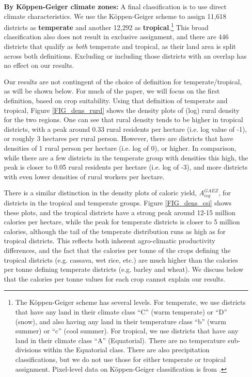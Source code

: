 \documentclass[11pt]{article}
\begin{document}
\vspace{.5cm}\noindent\textbf{By K{\"o}ppen-Geiger climate zones:} A final classification is to use direct climate characteristics. We use the K{\"o}ppen-Geiger scheme to assign 11,618 districts as \textbf{temperate} and another 12,292 as \textbf{tropical}.\footnote{The K{\"o}ppen-Geiger scheme has several levels. For temperate, we use districts that have any land in their climate class ``C'' (warm temperate) or ``D'' (snow), and also having any land in their temperature class ``b'' (warm summer) or ``c'' (cool summer). For tropical, we use districts that have any land in their climate class ``A'' (Equatorial). There are no temperature sub-divisions within the Equatorial class. There are also precipitation classifications, but we do not use those for either temperate or tropical assignment. Pixel-level data on K{\"o}ppen-Geiger classification is from \cite{kottek2006}.} This broad classification also does not result in exclusive assignment, and there are 446 districts that qualify as \textit{both} temperate and tropical, as their land area is split across both definitions. Excluding or including those districts with an overlap has no effect on our results.

\vspace{.5cm} 
Our results are not contingent of the choice of definition for temperate/tropical, as will be shown below. For much of the paper, we will focus on the first definition, based on crop suitability. Using that definition of temperate and tropical, Figure \ref{FIG_dens_rurd} shows the density plots of (log) rural density for the two regions. One can see that rural density tends to be higher in tropical districts, with a peak around 0.33 rural residents per hectare (i.e. log value of -1), or roughly 3 hectares per rural person. However, there are districts that have densities of 1 rural person per hectare (i.e. log of 0), or higher. In comparison, while there are a few districts in the temperate group with densities this high, the peak is closer to 0.05 rural residents per hectare (i.e. log of -3), and more districts with even lower densities of rural workers per hectare. 

There is a similar distinction in the density plots of caloric yield, $A_{isg}^{GAEZ}$, for districts in the tropical and temperate groups. Figure \ref{FIG_dens_csi} shows these plots, and the tropical districts have a strong peak around 12-15 million calories per hectare, while the peak for temperate districts is closer to 5 million calories, although the tail of the temperate distribution runs as high as for tropical districts. This reflects both inherent agro-climatic productivity differences, and the fact that the calories per tonne of the crops defining the tropical districts (e.g. cassava, wet rice, etc.) are much higher than the calories per tonne defining temperate districts (e.g. barley and wheat). We discuss below that the calories per tonne values for each crop cannot explain our results.
\end{document}
